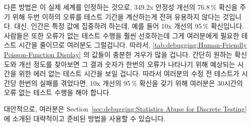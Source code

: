 {{	다른 방법은 이 실제 세계를 인정하는 것으로, 349.2x 안정성 개선의
	76.8\,\% 확신을 주기 위해 두번 이하의 오류를 테스트 기간을 계산하는게
	전혀 유용하지 않다는 것입니다.
	대신, 인간은 특정 값에 집중하려 하는데, 예를 들어 10x 개선의 95\,\%
	확신입니다.
	사람들은 또한 오류가 없는 테스트 수행을 훨씬 선호하는데 그게 여러분에게
	필요한 테스트 시간을 줄이므로 여러분도 그럴겁니다.
	따라서,
	\cref{tab:debugging:Human-Friendly Poisson-Function Display}
	의 값들이 충분한 겨우가 많을 겁니다.
	간단히 원하는 확신도와 개선 정도를 찾아보면 그 결과 숫자가 한번의
	오류가 나타나기 위해 예상되는 시간을 위한 에러 없는 테스트 시간을 보일
	겁니다.
	따라서 여러분의 수정 전 테스트가 시간당 한번의 실패를 겪었다면, 10x
	개선의 95\,\% 확신을 갖기 위해 여러분은 30시간의 오류 없는 테스트
	수행을 해야 합니다.

	대안적으로, 여러분은
	Section~\ref{sec:debugging:Statistics Abuse for Discrete Testing}
	에 소개된 대략적이고 준비된 방법을 사용할 수 있습니다.

}\QuickQuizEndB
%
}
